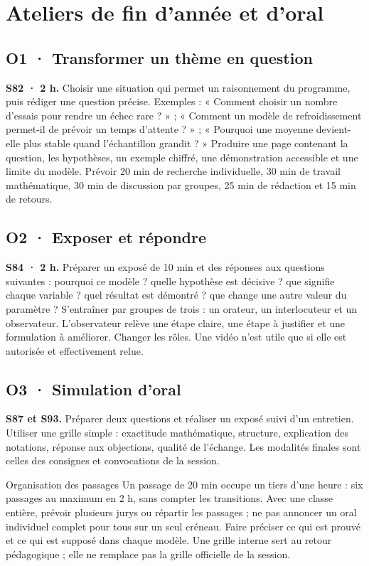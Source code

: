 \chapter{Ateliers de fin d'année et d'oral}
\section{O1 · Transformer un thème en question}
\textbf{S82 · 2 h.} Choisir une situation qui permet un raisonnement du programme, puis rédiger une question précise. Exemples : « Comment choisir un nombre d'essais pour rendre un échec rare ? » ; « Comment un modèle de refroidissement permet-il de prévoir un temps d'attente ? » ; « Pourquoi une moyenne devient-elle plus stable quand l'échantillon grandit ? »
Produire une page contenant la question, les hypothèses, un exemple chiffré, une démonstration accessible et une limite du modèle. Prévoir 20 min de recherche individuelle, 30 min de travail mathématique, 30 min de discussion par groupes, 25 min de rédaction et 15 min de retours.
\section{O2 · Exposer et répondre}
\textbf{S84 · 2 h.} Préparer un exposé de 10 min et des réponses aux questions suivantes : pourquoi ce modèle ? quelle hypothèse est décisive ? que signifie chaque variable ? quel résultat est démontré ? que change une autre valeur du paramètre ?
S'entraîner par groupes de trois : un orateur, un interlocuteur et un observateur. L'observateur relève une étape claire, une étape à justifier et une formulation à améliorer. Changer les rôles. Une vidéo n'est utile que si elle est autorisée et effectivement relue.
\section{O3 · Simulation d'oral}
\textbf{S87 et S93.} Préparer deux questions et réaliser un exposé suivi d'un entretien. Utiliser une grille simple : exactitude mathématique, structure, explication des notations, réponse aux objections, qualité de l'échange. Les modalités finales sont celles des consignes et convocations de la session.
\ifprof\begin{profbox}{Organisation des passages}
Un passage de 20 min occupe un tiers d'une heure : six passages au maximum en 2 h, sans compter les transitions. Avec une classe entière, prévoir plusieurs jurys ou répartir les passages ; ne pas annoncer un oral individuel complet pour tous sur un seul créneau. Faire préciser ce qui est prouvé et ce qui est supposé dans chaque modèle. Une grille interne sert au retour pédagogique ; elle ne remplace pas la grille officielle de la session.
\end{profbox}\fi
